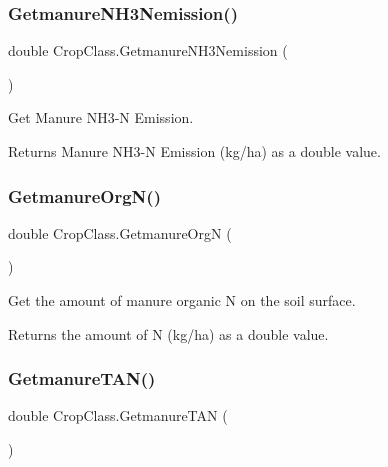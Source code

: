 \subsubsection{\texorpdfstring{GetmanureNH3Nemission()}{GetmanureNH3Nemission()}}
{\footnotesize\ttfamily double Crop\+Class.\+Getmanure\+N\+H3\+Nemission (\begin{DoxyParamCaption}{ }\end{DoxyParamCaption})\hspace{0.3cm}{\ttfamily [inline]}}



Get Manure N\+H3-\/N Emission. 

\begin{DoxyReturn}{Returns}
Manure N\+H3-\/N Emission (kg/ha) as a double value. 
\end{DoxyReturn}
\mbox{\label{class_crop_class_a88bcd4b2bad88a2c0269e456eef3bf59}} 
\subsubsection{\texorpdfstring{GetmanureOrgN()}{GetmanureOrgN()}}
{\footnotesize\ttfamily double Crop\+Class.\+Getmanure\+OrgN (\begin{DoxyParamCaption}{ }\end{DoxyParamCaption})\hspace{0.3cm}{\ttfamily [inline]}}



Get the amount of manure organic N on the soil surface. 

\begin{DoxyReturn}{Returns}
the amount of N (kg/ha) as a double value. 
\end{DoxyReturn}
\mbox{\label{class_crop_class_af24daf4f7c4f8da19d3c40c4d008b657}} 
\subsubsection{\texorpdfstring{GetmanureTAN()}{GetmanureTAN()}}
{\footnotesize\ttfamily double Crop\+Class.\+Getmanure\+T\+AN (\begin{DoxyParamCaption}{ }\end{DoxyParamCaption})\hspace{0.3cm}{\ttfamily [inline]}}



